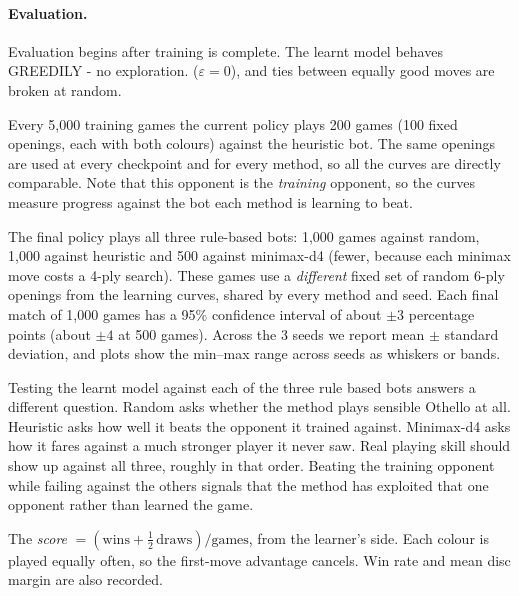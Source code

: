 \documentclass[11pt]{article}
\begin{document}
\paragraph{Evaluation.}
\begin{description}[leftmargin=1.2em,style=nextline,itemsep=2pt]
  \item[What is evaluated:] Evaluation begins after training is complete. The learnt model behaves GREEDILY - no exploration.
        ($\varepsilon=0$), and ties between equally good moves are broken at random.
  \item[Learning curves (during training):] Every 5{,}000 training games the
        current policy plays 200 games (100 fixed openings, each with both
        colours) against the heuristic bot. The same openings are used at every
        checkpoint and for every method, so all the curves are directly
        comparable. Note that this opponent is the \emph{training} opponent, so
        the curves measure progress against the bot each method is learning
        to beat.
  \item[Final comparison (after training):] The final policy plays all three
        rule-based bots: 1{,}000 games against random, 1{,}000 against
        heuristic and 500 against minimax-d4 (fewer, because each minimax move
        costs a 4-ply search). These games use a \emph{different} fixed set of
        random 6-ply openings from the learning curves, shared by every method
        and seed. Each final match of 1{,}000 games has a 95\% confidence
        interval of about $\pm3$ percentage points (about $\pm4$ at 500 games).
        Across the 3 seeds we report mean $\pm$ standard deviation, and plots
        show the min--max range across seeds as whiskers or bands.
  \item[Why three opponents:] Testing the learnt model against each of the three 
        rule based bots answers a different question. Random asks
        whether the method plays sensible Othello at all. Heuristic asks how
        well it beats the opponent it trained against. Minimax-d4 asks how it
        fares against a much stronger player it never saw. Real playing skill
        should show up against all three, roughly in that order. Beating the
        training opponent while failing against the others signals that the
        method has exploited that one opponent rather than learned the game.
  \item[Metric:] The \emph{score} $= (\text{wins} + \tfrac12\,\text{draws}) /
        \text{games}$, from the learner's side. Each colour is played equally
        often, so the first-move advantage cancels. Win rate and mean disc
        margin are also recorded.
\end{description}
\newpage
\end{document}
